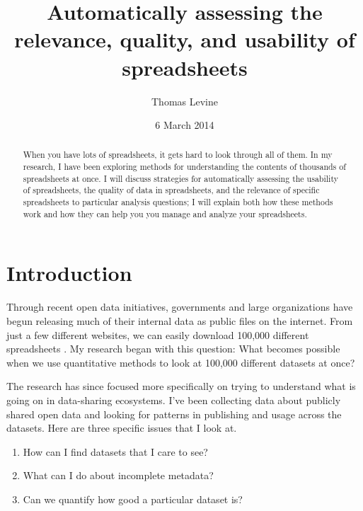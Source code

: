 \documentclass{acm_proc_article-sp}
\begin{document}
\title{Automatically assessing the relevance, quality, and usability of spreadsheets}
\author{ \alignauthor Thomas Levine\\  }
\date{6 March 2014}
\maketitle
\begin{abstract}
When you have lots of spreadsheets, it gets hard to look through all of them.
In my research, I have been exploring methods for understanding the contents
of thousands of spreadsheets at once. I will discuss strategies for automatically
assessing the usability of spreadsheets, the quality of data
in spreadsheets, and the relevance of specific spreadsheets to particular
analysis questions; I will explain both how these methods work and how they
can help you you manage and analyze your spreadsheets.
\end{abstract}


\section{Introduction}
Through recent open data initiatives, governments and large organizations have
begun releasing much of their internal data as public files on the internet.
From just a few different websites, we can easily download 100,000 different
spreadsheets \cite{ny-talk}.
My research began with this question: What becomes possible when we use
quantitative methods to look at 100,000 different datasets at once?

The research has since focused more specifically on trying to understand what
is going on in data-sharing ecosystems.
I've been collecting data about publicly shared open data
and looking for patterns in publishing and usage across the datasets.
Here are three specific issues that I look at.

\begin{enumerate}
\item How can I find datasets that I care to see?
\item What can I do about incomplete metadata?
\item Can we quantify how good a particular dataset is?
\end{enumerate}
\end{document}
